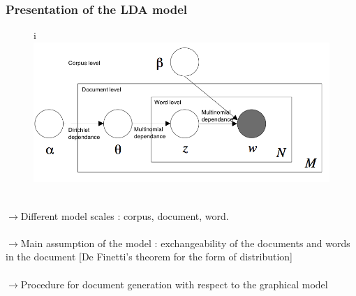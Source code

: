 \documentclass{beamer}
\begin{document}
\begin{frame}
\frametitle{Presentation of the LDA model}
\begin{figure}i
\includegraphics[width=18cm]{LDA}~\\
\end{figure}

$\rightarrow$Different model scales : corpus, document, word.~\\
~\\
$\rightarrow$Main assumption of the model : exchangeability of the documents and words in the document [De Finetti's theorem for the form of distribution]~\\
~\\
$\rightarrow$Procedure for document generation with respect to the graphical model~\\

\end{frame}
\end{document}
